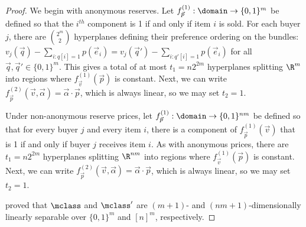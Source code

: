 \itemGeneral*

\begin{proof}
We begin with anonymous reserves. Let $f_{\vec{p}}^{(1)}: \domain \to \{0,1\}^m$ be defined so that the $i^{th}$ component is 1 if and only if item $i$ is sold. For each buyer $j$, there are ${2^m \choose 2}$ hyperplanes defining their preference ordering on the bundles: $v_j(\vec{q}) - \sum_{i: q[i] = 1} p(\vec{e}_i) = v_j(\vec{q}') - \sum_{i: q'[i] = 1} p(\vec{e}_i)$ for all $\vec{q}, \vec{q}' \in \{0,1\}^m$. This gives a total of at most $t_1 = n2^{2m}$ hyperplanes splitting $\R^m$ into regions where $f_{\vec{v}}^{(1)}(\vec{p})$ is constant. Next, we can write $f_{\vec{p}}^{(2)}(\vec{v}, \vec{\alpha}) = \vec{\alpha} \cdot \vec{p}$, which is always linear, so we may set $t_2 = 1$.

Under non-anonymous reserve prices, let $f_{\vec{p}}^{(1)}: \domain \to \{0,1\}^{nm}$ be defined so that for every buyer $j$ and every item $i$, there is a component of $f_{\vec{p}}^{(1)}(\vec{v})$ that is 1 if and only if buyer $j$ receives item $i$. As with anonymous prices, there are $t_1 = n2^{2m}$ hyperplanes splitting $\R^{nm}$ into regions where $f_{\vec{v}}^{(1)}(\vec{p})$ is constant. Next, we can write $f_{\vec{p}}^{(2)}(\vec{v}, \vec{\alpha}) = \vec{\alpha} \cdot \vec{p}$, which is always linear, so we may set $t_2 = 1$.

\citet{Morgenstern16:Learning} proved that $\mclass$ and $\mclass'$ are $(m+1)$- and $(nm+1)$-dimensionally linearly separable over $\{0,1\}^m$ and $[n]^m$, respectively.
\end{proof}
